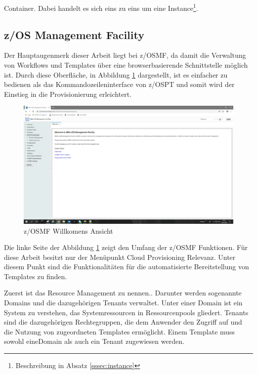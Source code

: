 \glqq Container\grqq{}.
Dabei handelt es sich eins zu eins um eine \glqq Instance\grqq \footnote{Beschreibung in Absatz \ref{sssec:instance}}.
\cite{IBM.2019b}

\subsection{z/OS Management Facility}\label{sssec:zosmf}
Der Hauptaugenmerk dieser Arbeit liegt  bei z/OSMF, da damit die Verwaltung von Workflows und Templates über eine browserbasierende Schnittstelle möglich ist.
Durch diese Oberfläche, in Abbildung \ref{fig:zosmf_welcome} dargestellt, ist es einfacher zu bedienen als das Kommandozeileninterface von z/OSPT  und somit wird der Einstieg in die Provisionierung erleichtert.

\begin{figure}[h]
\centering
\includegraphics[width=\textwidth]{figures/zosmf.png}
\caption{z/OSMF Willkomens Ansicht}
\label{fig:zosmf_welcome}
\end{figure}

Die linke Seite der Abbildung \ref{fig:zosmf_welcome} zeigt den Umfang der z/OSMF  Funktionen.
Für diese Arbeit besitzt nur der Menüpunkt \glqq Cloud Provisioning\grqq{} Relevanz.
Unter diesem Punkt sind die Funktionalitäten für die automatisierte Bereitstellung von Templates zu finden.
\cite{Rotthove.2018}

Zuerst ist das \glqq Resource Management\grqq{} zu nennen..
Darunter werden sogenannte \glqq Domains\grqq{} und die dazugehörigen \glqq Tenants\grqq{} verwaltet.
Unter einer \glqq Domain\grqq{} ist ein System zu verstehen, das Systemressourcen in Ressourcenpools gliedert.
\glqq Tenants\grqq{} sind die dazugehörigen Rechtegruppen, die dem Anwender den Zugriff auf und die Nutzung von zugeordneten Templates ermöglicht.
Einem Template muss sowohl eine\glqq Domain\grqq{} als auch ein \glqq Tenant\grqq{} zugewiesen werden.
\cite{Rotthove.2018}

